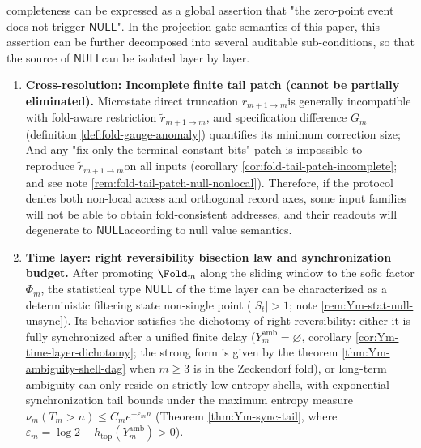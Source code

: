 \begin{remark}\label{rem:xi-completeness-auditable-decomposition}
completeness can be expressed as a global assertion that "the zero-point event does not trigger \(\mathsf{NULL}\)".
In the projection gate semantics of this paper, this assertion can be further decomposed into several auditable sub-conditions, so that the source of \(\mathsf{NULL}\) ​​can be isolated layer by layer.
\begin{enumerate}
  \item ​​\textbf{Cross-resolution: Incomplete finite tail patch (cannot be partially eliminated). }
  Microstate direct truncation \(r_{m+1\to m}\) ​​is generally incompatible with fold-aware restriction \(\widetilde r_{m+1\to m}\), and specification difference \(G_m\) (definition \ref{def:fold-gauge-anomaly}) quantifies its minimum correction size;
  And any "fix only the terminal constant bits" patch is impossible to reproduce \(\widetilde r_{m+1\to m}\) ​​on all inputs (corollary \ref{cor:fold-tail-patch-incomplete}; and see note \ref{rem:fold-tail-patch-null-nonlocal}).
  Therefore, if the protocol denies both non-local access and orthogonal record axes, some input families will not be able to obtain fold-consistent addresses, and their readouts will degenerate to \(\mathsf{NULL}\) ​​according to null value semantics.

  \item ​​\textbf{Time layer: right reversibility bisection law and synchronization budget. }
  After promoting \(\Fold_m\) ​​along the sliding window to the sofic factor \(\Phi_m\), the statistical type \(\mathsf{NULL}\) of the time layer can be characterized as a deterministic filtering state non-single point (\(|S_t|>1\); note \ref{rem:Ym-stat-null-unsync}).
  Its behavior satisfies the dichotomy of right reversibility: either it is fully synchronized after a unified finite delay (\(Y_m^{\mathrm{amb}}=\varnothing\), corollary \ref{cor:Ym-time-layer-dichotomy}; the strong form is given by the theorem \ref{thm:Ym-ambiguity-shell-dag} when \(m\ge 3\) is in the Zeckendorf fold), or long-term ambiguity can only reside on strictly low-entropy shells, with exponential synchronization tail bounds under the maximum entropy measure \(\nu_m(T_m>n)\le C_m e^{-\varepsilon_m n}\) (Theorem \ref{thm:Ym-sync-tail}, where \(\varepsilon_m=\log 2-h_{\mathrm{top}}(Y_m^{\mathrm{amb}})>0\)).


\end{enumerate}
\end{remark}
